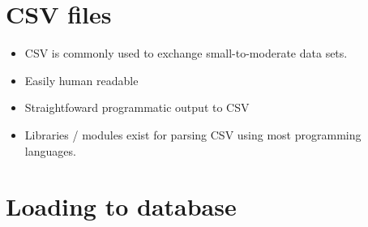 \documentclass[slides]{pgnotes}
\begin{document}
\maketitle

\tableofcontents

\section{CSV files}

\begin{itemize}
\item CSV is commonly used to exchange small-to-moderate data sets.
\item Easily human readable
\item Straightfoward programmatic output to CSV
\item Libraries / modules exist for parsing CSV using most programming languages.
\end{itemize}

\section{Loading to database}
\end{document}
